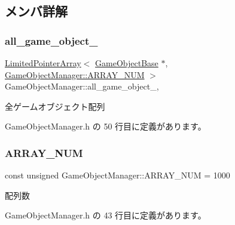 \subsection{メンバ詳解}
\mbox{\label{class_game_object_manager_aeaf98831f542f93db15c54a4948d6331}} 
\subsubsection{\texorpdfstring{all\+\_\+game\+\_\+object\+\_\+}{all\_game\_object\_}}
{\footnotesize\ttfamily \mbox{\hyperlink{class_limited_pointer_array}{Limited\+Pointer\+Array}}$<$ \mbox{\hyperlink{class_game_object_base}{Game\+Object\+Base}} $\ast$, \mbox{\hyperlink{class_game_object_manager_a591934d64d750c10c03c908371470681}{Game\+Object\+Manager\+::\+A\+R\+R\+A\+Y\+\_\+\+N\+UM}} $>$ Game\+Object\+Manager\+::all\+\_\+game\+\_\+object\+\_\+\hspace{0.3cm}{\ttfamily [static]}, {\ttfamily [private]}}



全ゲームオブジェクト配列 



 Game\+Object\+Manager.\+h の 50 行目に定義があります。

\mbox{\label{class_game_object_manager_a591934d64d750c10c03c908371470681}} 
\subsubsection{\texorpdfstring{A\+R\+R\+A\+Y\+\_\+\+N\+UM}{ARRAY\_NUM}}
{\footnotesize\ttfamily const unsigned Game\+Object\+Manager\+::\+A\+R\+R\+A\+Y\+\_\+\+N\+UM = 1000\hspace{0.3cm}{\ttfamily [static]}}



配列数 



 Game\+Object\+Manager.\+h の 43 行目に定義があります。

